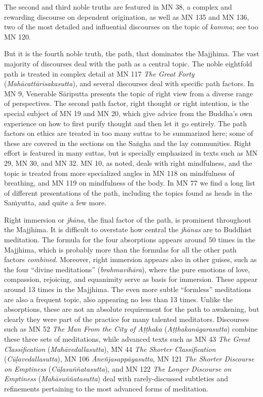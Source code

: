 \documentclass[12pt,openany]{book}%
\begin{document}
The second and third noble truths are featured in MN 38, a complex and rewarding discourse on dependent origination, as well as MN 135 and MN 136, two of the most detailed and influential discourses on the topic of \textit{kamma}; see too MN 120.

But it is the fourth noble truth, the path, that dominates the Majjhima. The vast majority of discourses deal with the path as a central topic. The noble eightfold path is treated in complex detail at MN 117 \textit{The Great Forty} (\textit{\textsanskrit{Mahācattārīsakasutta}}), and several discourses deal with specific path factors. In MN 9, Venerable \textsanskrit{Sāriputta} presents the topic of right view from a diverse range of perspectives. The second path factor, right thought or right intention, is the special subject of MN 19 and MN 20, which give advice from the Buddha’s own experience on how to first purify thought and then let it go entirely. The path factors on ethics are treated in too many suttas to be summarized here; some of these are covered in the sections on the \textsanskrit{Saṅgha} and the lay communities. Right effort is featured in many suttas, but is specially emphasized in texts such as MN 29, MN 30, and MN 32. MN 10, as noted, deals with right mindfulness, and the topic is treated from more specialized angles in MN 118 on mindfulness of breathing, and MN 119 on mindfulness of the body. In MN 77 we find a long list of different presentations of the path, including the topics found as heads in the \textsanskrit{Saṁyutta}, and quite a few more.

Right immersion or \emph{\textsanskrit{jhāna}}, the final factor of the path, is prominent throughout the Majjhima. It is difficult to overstate how central the \textit{\textsanskrit{jhānas}} are to Buddhist meditation. The formula for the four absorptions appears around 50 times in the Majjhima, which is probably more than the formulas for all the other path factors \emph{combined}. Moreover, right immersion appears also in other guises, such as the four “divine meditations” (\textit{\textsanskrit{brahmavihāra}}), where the pure emotions of love, compassion, rejoicing, and equanimity serve as basis for immersion. These appear around 13 times in the Majjhima. The even more subtle “formless” meditations are also a frequent topic, also appearing no less than 13 times. Unlike the absorptions, these are not an absolute requirement for the path to awakening, but clearly they were part of the practice for many talented meditators. Discourses such as MN 52 \textit{The Man From the City of \textsanskrit{Aṭṭhaka}} (\textit{\textsanskrit{Aṭṭhakanāgarasutta}}) combine these three sets of meditations, while advanced texts such as MN 43 \textit{The Great Classification} (\textit{\textsanskrit{Mahāvedallasutta}}), MN 44 \textit{The Shorter Classification} (\textit{\textsanskrit{Cūḷavedallasutta}}), MN 106 \textit{\textsanskrit{Āneñjasappāyasutta}}, MN 121 \textit{The Shorter Discourse on Emptiness} (\textit{\textsanskrit{Cūḷasuññatasutta}}), and MN 122 \textit{The Longer Discourse on Emptiness} (\textit{\textsanskrit{Mahāsuññatasutta}}) deal with rarely-discussed subtleties and refinements pertaining to the most advanced forms of meditation.
\end{document}
